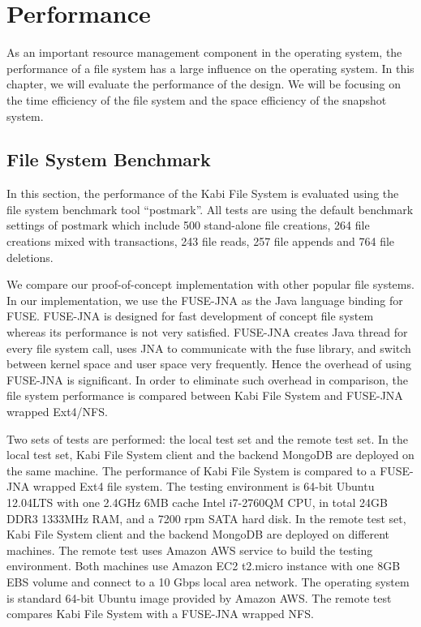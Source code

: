 \chapter{Performance}
\label{chap:perform}

    As an important resource management component in the operating system, the performance of a file system has a large influence on the operating system. In this chapter, we will evaluate the performance of the design. We will be focusing on the time efficiency of the file system and the space efficiency of the snapshot system.

\section{File System Benchmark}

    In this section, the performance of the Kabi File System is evaluated using the file system benchmark tool ``postmark''\cite{postmark}. All tests are using the default benchmark settings of postmark which include 500 stand-alone file creations, 264 file creations mixed with transactions, 243 file reads, 257 file appends and 764 file deletions.

    We compare our proof-of-concept implementation with other popular file systems. In our implementation, we use the FUSE-JNA\cite{fusejna}  as the Java language binding for FUSE. FUSE-JNA is designed for fast development of concept file system whereas its performance is not very satisfied. FUSE-JNA creates Java thread for every file system call, uses JNA to communicate with the fuse library, and switch between kernel space and user space very frequently. Hence the overhead of using FUSE-JNA is significant. In order to eliminate such overhead in comparison, the file system performance is compared between Kabi File System and FUSE-JNA wrapped Ext4/NFS.

    Two sets of tests are performed: the local test set and the remote test set. In the local test set, Kabi File System client and the backend MongoDB are deployed on the same machine. The performance of Kabi File System is compared to a FUSE-JNA wrapped Ext4 file system. The testing environment is 64-bit Ubuntu 12.04LTS with one 2.4GHz 6MB cache Intel i7-2760QM CPU, in total 24GB DDR3 1333MHz RAM, and a 7200 rpm SATA hard disk. In the remote test set, Kabi File System client and the backend MongoDB are deployed on different machines. The remote test uses Amazon AWS service to build the testing environment. Both machines use Amazon EC2 t2.micro instance with one 8GB EBS volume and connect to a 10 Gbps local area network. The operating system is standard 64-bit Ubuntu image provided by Amazon AWS. The remote test compares Kabi File System with a FUSE-JNA wrapped NFS. 

